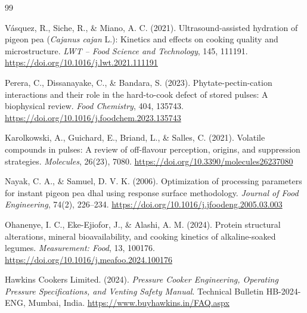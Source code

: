 \documentclass[10pt,a4paper]{article}
\begin{document}
\begin{thebibliography}{99}

V\'{a}squez, R., Siche, R., \& Miano, A. C. (2021).
\newblock Ultrasound-assisted hydration of pigeon pea (\textit{Cajanus cajan} L.): Kinetics and effects on cooking quality and microstructure.
\newblock \textit{LWT -- Food Science and Technology}, 145, 111191.
\newblock \url{https://doi.org/10.1016/j.lwt.2021.111191}

Perera, C., Dissanayake, C., \& Bandara, S. (2023).
\newblock Phytate-pectin-cation interactions and their role in the hard-to-cook defect of stored pulses: A biophysical review.
\newblock \textit{Food Chemistry}, 404, 135743.
\newblock \url{https://doi.org/10.1016/j.foodchem.2023.135743}

Karolkowski, A., Guichard, E., Briand, L., \& Salles, C. (2021).
\newblock Volatile compounds in pulses: A review of off-flavour perception, origins, and suppression strategies.
\newblock \textit{Molecules}, 26(23), 7080.
\newblock \url{https://doi.org/10.3390/molecules26237080}

Nayak, C. A., \& Samuel, D. V. K. (2006).
\newblock Optimization of processing parameters for instant pigeon pea dhal using response surface methodology.
\newblock \textit{Journal of Food Engineering}, 74(2), 226--234.
\newblock \url{https://doi.org/10.1016/j.jfoodeng.2005.03.003}

Ohanenye, I. C., Eke-Ejiofor, J., \& Alashi, A. M. (2024).
\newblock Protein structural alterations, mineral bioavailability, and cooking kinetics of alkaline-soaked legumes.
\newblock \textit{Measurement: Food}, 13, 100176.
\newblock \url{https://doi.org/10.1016/j.meafoo.2024.100176}

Hawkins Cookers Limited. (2024).
\newblock \textit{Pressure Cooker Engineering, Operating Pressure Specifications, and Venting Safety Manual}.
\newblock Technical Bulletin HB-2024-ENG, Mumbai, India.
\newblock \url{https://www.buyhawkins.in/FAQ.aspx}

\end{thebibliography}
\end{document}
